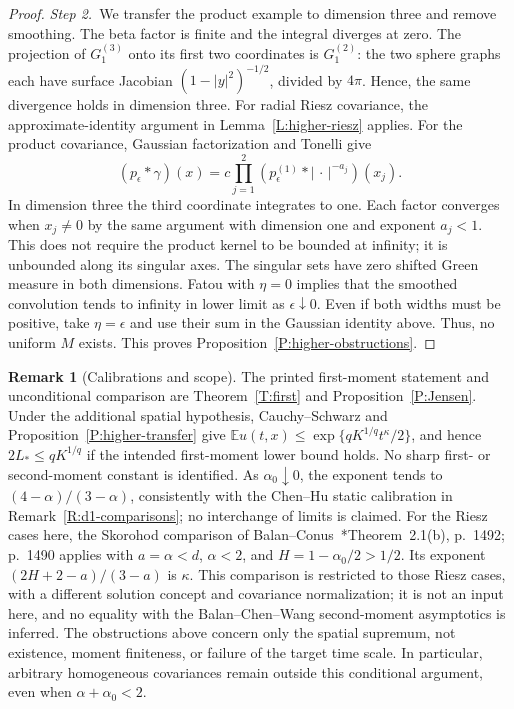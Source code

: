 \documentclass[12pt,oneside,openany]{book}
\numberwithin{equation}{section}
\theoremstyle{nogostyle}
\theoremstyle{definition}
\newtheorem{remark}[theorem]{Remark}
\newcommand{\E}{\mathbb{E}}
\begin{document}
\begin{proof}
  \medskip
  \noindent\textit{Step 2.~}We transfer the product example to dimension three
  and remove smoothing.
  The beta factor is finite and the integral diverges at zero. The projection of
  $G_1^{(3)}$ onto its first two coordinates is $G_1^{(2)}$: the two sphere
  graphs each have surface Jacobian $(1-|y|^2)^{-1/2}$, divided by $4\pi$.
  Hence, the same divergence holds in dimension three. For radial Riesz
  covariance, the approximate-identity argument in Lemma~\ref{L:higher-riesz}
  applies. For the product covariance, Gaussian factorization and Tonelli give
  \[
    (p_\epsilon*\gamma)(x)
    =c\prod_{j=1}^2
    (p_\epsilon^{(1)}*|\,\cdot\,|^{-a_j})(x_j).
  \]
  In dimension three the third coordinate integrates to one. Each factor
  converges when $x_j \ne 0$ by the same argument with dimension one and
  exponent $a_j < 1$. This does not require the product kernel to be bounded at
  infinity; it is unbounded along its singular axes. The singular sets have zero
  shifted Green measure in both dimensions. Fatou with $\eta = 0$ implies that
  the smoothed convolution tends to infinity in lower limit as
  $\epsilon\downarrow0$. Even if both widths must be positive, take $\eta =
  \epsilon$ and use their sum in the Gaussian identity above. Thus, no uniform
  $M$ exists. This proves Proposition~\ref{P:higher-obstructions}.
\end{proof}

\begin{remark}[Calibrations and scope]\label{R:higher-calibrations}
  The printed first-moment statement and unconditional comparison are
  Theorem~\ref{T:first} and Proposition~\ref{P:Jensen}. Under the additional
  spatial hypothesis, Cauchy--Schwarz and Proposition~\ref{P:higher-transfer}
  give $\E u(t,x) \le \exp\{qK^{1/q}t^\kappa/2\}$, and hence $2L_* \le qK^{1/q}$
  if the intended first-moment lower bound holds. No sharp first- or
  second-moment constant is identified. As $\alpha_0\downarrow0$, the exponent
  tends to $(4-\alpha)/(3-\alpha)$, consistently with the Chen--Hu static
  calibration in Remark~\ref{R:d1-comparisons}; no interchange of limits is
  claimed. For the Riesz cases here, the Skorohod comparison of
  Balan--Conus~\cite{balan.conus:16:intermittency}*{Theorem~2.1(b), p.~1492;
  p.~1490} applies with $a = \alpha < d$, $\alpha < 2$, and $H = 1-\alpha_0/2 >
  1/2$. Its exponent $(2H+2-a)/(3-a)$ is $\kappa$. This comparison is restricted
  to those Riesz cases, with a different solution concept and covariance
  normalization; it is not an input here, and no equality with the
  Balan--Chen--Wang second-moment asymptotics is inferred. The obstructions
  above concern only the spatial supremum, not existence, moment finiteness, or
  failure of the target time scale. In particular, arbitrary homogeneous
  covariances remain outside this conditional argument, even when
  $\alpha+\alpha_0 < 2$.
\end{remark}
\end{document}
